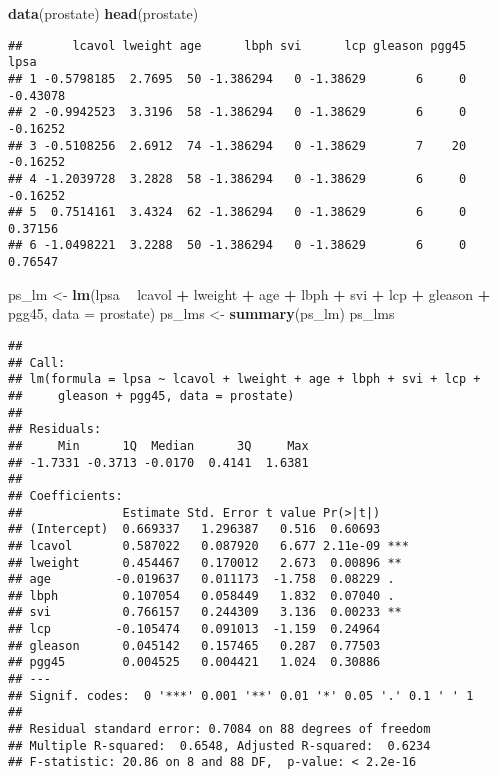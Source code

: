 \documentclass[
]{article}
\newenvironment{Shaded}{\begin{snugshade}}{\end{snugshade}}
\newcommand{\DataTypeTok}[1]{\textcolor[rgb]{0.13,0.29,0.53}{#1}}
\newcommand{\KeywordTok}[1]{\textcolor[rgb]{0.13,0.29,0.53}{\textbf{#1}}}
\newcommand{\NormalTok}[1]{#1}
\newcommand{\OperatorTok}[1]{\textcolor[rgb]{0.81,0.36,0.00}{\textbf{#1}}}
\newcommand{\StringTok}[1]{\textcolor[rgb]{0.31,0.60,0.02}{#1}}
\begin{document}
\begin{Shaded}
\begin{Highlighting}[]
\KeywordTok{data}\NormalTok{(prostate)}
\KeywordTok{head}\NormalTok{(prostate)}
\end{Highlighting}
\end{Shaded}

\begin{verbatim}
##       lcavol lweight age      lbph svi      lcp gleason pgg45     lpsa
## 1 -0.5798185  2.7695  50 -1.386294   0 -1.38629       6     0 -0.43078
## 2 -0.9942523  3.3196  58 -1.386294   0 -1.38629       6     0 -0.16252
## 3 -0.5108256  2.6912  74 -1.386294   0 -1.38629       7    20 -0.16252
## 4 -1.2039728  3.2828  58 -1.386294   0 -1.38629       6     0 -0.16252
## 5  0.7514161  3.4324  62 -1.386294   0 -1.38629       6     0  0.37156
## 6 -1.0498221  3.2288  50 -1.386294   0 -1.38629       6     0  0.76547
\end{verbatim}

\begin{Shaded}
\begin{Highlighting}[]
\NormalTok{ps_lm <-}\StringTok{ }\KeywordTok{lm}\NormalTok{(lpsa }\OperatorTok{~}\StringTok{ }\NormalTok{lcavol }\OperatorTok{+}\StringTok{ }\NormalTok{lweight }\OperatorTok{+}\StringTok{ }\NormalTok{age }\OperatorTok{+}\StringTok{ }\NormalTok{lbph }\OperatorTok{+}\StringTok{ }\NormalTok{svi }\OperatorTok{+}\StringTok{ }\NormalTok{lcp }\OperatorTok{+}\StringTok{ }\NormalTok{gleason }\OperatorTok{+}\StringTok{ }\NormalTok{pgg45, }\DataTypeTok{data =}\NormalTok{ prostate)}
\NormalTok{ps_lms <-}\StringTok{ }\KeywordTok{summary}\NormalTok{(ps_lm)}
\NormalTok{ps_lms}
\end{Highlighting}
\end{Shaded}

\begin{verbatim}
## 
## Call:
## lm(formula = lpsa ~ lcavol + lweight + age + lbph + svi + lcp + 
##     gleason + pgg45, data = prostate)
## 
## Residuals:
##     Min      1Q  Median      3Q     Max 
## -1.7331 -0.3713 -0.0170  0.4141  1.6381 
## 
## Coefficients:
##              Estimate Std. Error t value Pr(>|t|)    
## (Intercept)  0.669337   1.296387   0.516  0.60693    
## lcavol       0.587022   0.087920   6.677 2.11e-09 ***
## lweight      0.454467   0.170012   2.673  0.00896 ** 
## age         -0.019637   0.011173  -1.758  0.08229 .  
## lbph         0.107054   0.058449   1.832  0.07040 .  
## svi          0.766157   0.244309   3.136  0.00233 ** 
## lcp         -0.105474   0.091013  -1.159  0.24964    
## gleason      0.045142   0.157465   0.287  0.77503    
## pgg45        0.004525   0.004421   1.024  0.30886    
## ---
## Signif. codes:  0 '***' 0.001 '**' 0.01 '*' 0.05 '.' 0.1 ' ' 1
## 
## Residual standard error: 0.7084 on 88 degrees of freedom
## Multiple R-squared:  0.6548, Adjusted R-squared:  0.6234 
## F-statistic: 20.86 on 8 and 88 DF,  p-value: < 2.2e-16
\end{verbatim}
\end{document}
